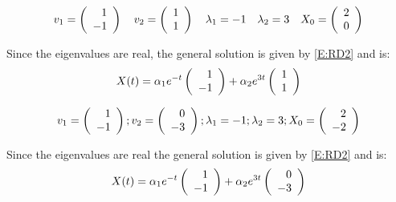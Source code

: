 \documentclass{ximera}
\begin{document}
\begin{exercise} \label{A6.4.1}
\[
v_1 = \Matrix{ 1 \\ -1} \quad  v_2 = \Matrix{ 1 \\ 1 }\quad  \lambda_1 = -1\quad \lambda_2 = 3\quad  X_0 = \Matrix{2 \\ 0 }
\]

\begin{solution}
\soln Since the eigenvalues are real, the general solution is given by \eqref{E:RD2} and is:
\[
X(t) = \alpha_1 e^{-t} \Matrix{ 1 \\ -1} + \alpha_2 e^{3t}\Matrix{ 1 \\ 1 }
\]
 
\begin{figure}[htb]
           \centerline{%
           }
\end{figure}

\end{solution}
\end{exercise}

\begin{exercise} \label{A6.4.2}
\[
v_1 = \Matrix{ 1 \\ -1}; v_2 = \Matrix{ 0 \\ -3 }; \lambda_1 = -1; \lambda_2 = 3; X_0 = \Matrix{2 \\ -2 }
\]

\begin{solution}
\soln Since the eigenvalues are real the general solution is given by \eqref{E:RD2} and is:
\[
X(t) = \alpha_1 e^{-t} \Matrix{ 1 \\ -1} + \alpha_2 e^{3t}\Matrix{ 0 \\ -3 }
\]

\begin{figure}[htb]
           \centerline{%
           }
\end{figure}
\end{solution}
\end{exercise}
\end{document}
